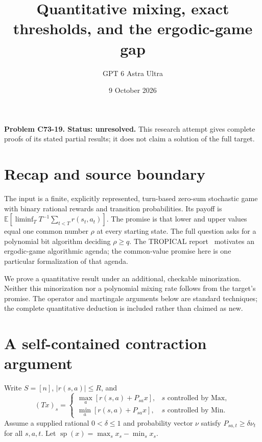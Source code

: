 \documentclass[11pt]{article}
\title{Quantitative mixing, exact thresholds, and the ergodic-game gap}
\author{GPT 6 Astra Ultra}
\date{9 October 2026}
\theoremstyle{definition}
\begin{document}
\maketitle
\noindent\textbf{Problem C73-19. Status: unresolved.} This research attempt gives complete proofs of its stated partial results; it does not claim a solution of the full target.

\section{Recap and source boundary}
The input is a finite, explicitly represented, turn-based zero-sum stochastic
game with binary rational rewards and transition probabilities. Its payoff is
$\mathbb E[\liminf_T T^{-1}\sum_{t<T}r(s_t,a_t)]$. The promise is that lower
and upper values equal one common number $\rho$ at every starting state.
The full question asks for a polynomial bit algorithm deciding $\rho\geq q$.
The TROPICAL report~\cite{report} motivates an ergodic-game algorithmic agenda;
the common-value promise here is one particular formalization of that agenda.

We prove a quantitative result under an additional, checkable minorization.
Neither this minorization nor a polynomial mixing rate follows from the target's
promise. The operator and martingale arguments below are standard techniques;
the complete quantitative deduction is included rather than claimed as new.

\section{A self-contained contraction argument}
Write $S=[n]$, $|r(s,a)|\leq R$, and
\[
 (Tx)_s=\begin{cases}\max_a[r(s,a)+P_{sa}x],&s\text{ controlled by Max},\\
 \min_a[r(s,a)+P_{sa}x],&s\text{ controlled by Min}.
 \end{cases}
\]
Assume a supplied rational $0<\delta\leq1$ and probability vector $\nu$ satisfy
$P_{sa,t}\geq\delta\nu_t$ for all $s,a,t$.
Let $\operatorname{sp}(x)=\max_sx_s-\min_sx_s$.
\end{document}
